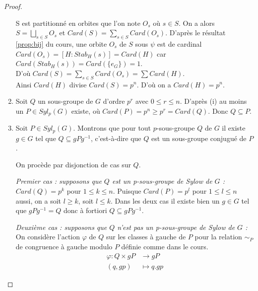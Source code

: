 \documentclass{article}
\theoremstyle{definition}
\theoremstyle{plain}
\theoremstyle{plain}
\theoremstyle{plain}
\theoremstyle{plain}
\theoremstyle{definition}
\theoremstyle{plain}
\theoremstyle{plain}
\begin{document}
\begin{proof}
\begin{enumerate}[label={\upshape(\roman*)}]
S est partitionné en orbites que l'on note \( O_s \) où \( s \in S \). On a alors \( S = \bigsqcup_{s \in S} O_{s} \) et \( Card(S) = \sum_{s \in S} Card(O_{s}) \).
D'après le résultat \ref{prop:bij} du cours, une orbite \( O_s \) de \( S \) sous \( \psi \) est de cardinal \( Card(O_s) = [H : Stab_{H}({s}) ] = Card(H) \) car \( Card(Stab_{H}({s})) = Card(\{e_{G}\}) = 1 \). \\
D'où \( Card(S) = \sum_{s \in S} Card(O_{s}) = \sum Card(H) \).\\ 
Ainsi \( Card(H) \) divise \( Card(S) = p^{n} \). D'où on a \( Card(H) = p^{n} \).

\item Soit \( Q \) un sous-groupe de \( G \) d'ordre \( p^{r} \) avec \( 0 \leq r \leq n \). 
D'après (i) au moins un \( P \in Syl_p(G) \) existe, où \( Card(P) = p^{n} \geq p ^{r} = Card(Q) \).
Donc \( Q \subseteq P \).

\item Soit \( P \in Syl_{p}({G}) \). Montrons que pour tout \(p\)-sous-groupe \( Q \) de \( G \) il existe \( g \in G \) tel que \( Q \subseteq gPg^{-1} \), c'est-à-dire que \( Q \) est un sous-groupe conjugué de \( P \). 

	On procède par disjonction de cas sur \( Q \).
	\par \textit{Premier cas : supposons que \( Q \) est un p-sous-groupe de Sylow de \( G \) :}\\
	\( Card(Q) = p^{k}\) pour \( 1 \le k \le n \). Puisque \( Card(P) = p^{l}\) pour 
	\( 1 \le l \le n \) aussi, on a soit \( l \ge k \), soit \( l \le k \). Dans les 
	deux cas il existe bien un \( g \in G \) tel que 
	\( gPg^{-1} = Q \) donc à fortiori \( Q \subseteq gPg^{-1} \).
	
	\par \textit{Deuxième cas : supposons que \( Q \) n'est pas un p-sous-groupe de Sylow de \( G \) :}\\ On considère l'action \( \varphi \) de \( Q \) sur les classes à gauche de \( P \) pour la relation \( \sim_{P} \) de congruence à gauche modulo \( P \) définie comme dans le cours. 
\begin{align*}
	\varphi : Q \times gP &\to gP \\
	(q,gp) &\mapsto q.gp
\end{align*}


\end{enumerate}
\end{proof}
\end{document}
